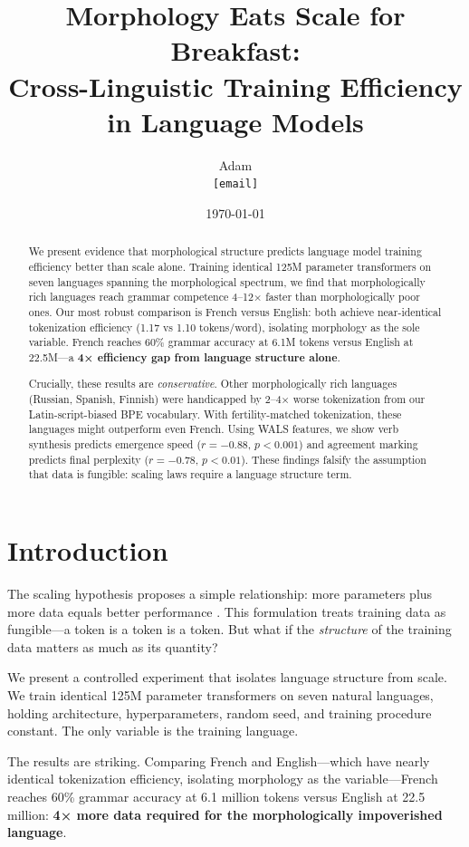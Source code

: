 \documentclass[11pt]{article}
\title{\textbf{Morphology Eats Scale for Breakfast:\\Cross-Linguistic Training Efficiency in Language Models}}
\author{
  Adam\\
  \texttt{[email]}
}
\date{\today}
\begin{document}
\maketitle

\begin{abstract}
We present evidence that morphological structure predicts language model training efficiency better than scale alone. Training identical 125M parameter transformers on seven languages spanning the morphological spectrum, we find that morphologically rich languages reach grammar competence 4--12× faster than morphologically poor ones. Our most robust comparison is French versus English: both achieve near-identical tokenization efficiency (1.17 vs 1.10 tokens/word), isolating morphology as the sole variable. French reaches 60\% grammar accuracy at 6.1M tokens versus English at 22.5M—a \textbf{4× efficiency gap from language structure alone}.

Crucially, these results are \textit{conservative}. Other morphologically rich languages (Russian, Spanish, Finnish) were handicapped by 2--4× worse tokenization from our Latin-script-biased BPE vocabulary. With fertility-matched tokenization, these languages might outperform even French. Using WALS features, we show verb synthesis predicts emergence speed ($r=-0.88$, $p<0.001$) and agreement marking predicts final perplexity ($r=-0.78$, $p<0.01$). These findings falsify the assumption that data is fungible: scaling laws require a language structure term.
\end{abstract}

\section{Introduction}

The scaling hypothesis proposes a simple relationship: more parameters plus more data equals better performance \citep{kaplan2020scaling, hoffmann2022training}. This formulation treats training data as fungible—a token is a token is a token. But what if the \textit{structure} of the training data matters as much as its quantity?

We present a controlled experiment that isolates language structure from scale. We train identical 125M parameter transformers on seven natural languages, holding architecture, hyperparameters, random seed, and training procedure constant. The only variable is the training language.

The results are striking. Comparing French and English—which have nearly identical tokenization efficiency, isolating morphology as the variable—French reaches 60\% grammar accuracy at 6.1 million tokens versus English at 22.5 million: \textbf{4× more data required for the morphologically impoverished language}.
\end{document}
